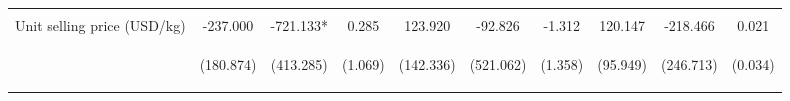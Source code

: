 \begin{center}
\begin{tabular}{lccccccccc}
\vspace{4pt} & \begin{footnotesize}[0.910]\end{footnotesize} & \begin{footnotesize}[0.025]\end{footnotesize} & \begin{footnotesize}[0.000]\end{footnotesize} & \begin{footnotesize}[0.634]\end{footnotesize} & \begin{footnotesize}[0.053]\end{footnotesize} & \begin{footnotesize}[0.000]\end{footnotesize} & \begin{footnotesize}[0.249]\end{footnotesize} & \begin{footnotesize}[0.580]\end{footnotesize} & \begin{footnotesize}[0.000]\end{footnotesize} \\
Unit selling price (USD/kg) & -237.000 & -721.133* & 0.285 & 123.920 & -92.826 & -1.312 & 120.147 & -218.466 & 0.021 \\
 & \begin{footnotesize}(180.874)\end{footnotesize} & \begin{footnotesize}(413.285)\end{footnotesize} & \begin{footnotesize}(1.069)\end{footnotesize} & \begin{footnotesize}(142.336)\end{footnotesize} & \begin{footnotesize}(521.062)\end{footnotesize} & \begin{footnotesize}(1.358)\end{footnotesize} & \begin{footnotesize}(95.949)\end{footnotesize} & \begin{footnotesize}(246.713)\end{footnotesize} & \begin{footnotesize}(0.034)\end{footnotesize} \\

\end{tabular}
\end{center}
